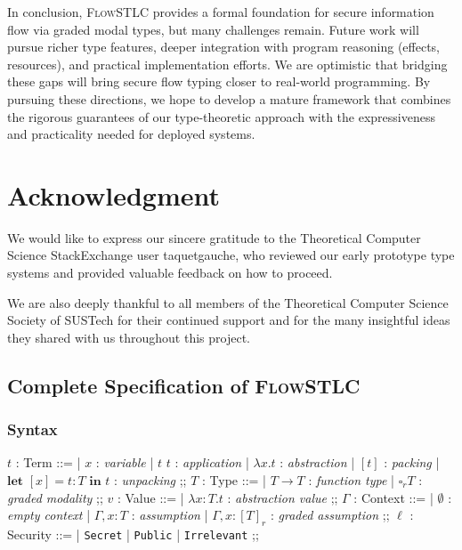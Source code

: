 \documentclass[conference]{IEEEtran}
\newcommand\lam[2]{\lambda #1.#2}
\newcommand\unp[3]{\textbf{let }[#1]=#2\textbf{ in }#3}
\newcommand\gradedt[2]{\square_#1 #2}
\newcommand\public{\texttt{Public}}
\newcommand\secret{\texttt{Secret}}
\newcommand\irrele{\texttt{Irrelevant}}
\begin{document}
In conclusion, \textsc{FlowSTLC} provides a formal foundation for secure information flow via graded modal types, but many challenges remain. Future work will pursue richer type features, deeper integration with program reasoning (effects, resources), and practical implementation efforts. We are optimistic that bridging these gaps will bring secure flow typing closer to real-world programming. By pursuing these directions, we hope to develop a mature framework that combines the rigorous guarantees of our type-theoretic approach with the expressiveness and practicality needed for deployed systems.

\section*{Acknowledgment}
We would like to express our sincere gratitude to the Theoretical Computer Science StackExchange user taquetgauche, who reviewed our early prototype type systems and provided valuable feedback on how to proceed.

We are also deeply thankful to all members of the Theoretical Computer Science Society of SUSTech for their continued support and for the many insightful ideas they shared with us throughout this project.




\newpage
\appendix

\subsection{Complete Specification of \textsc{FlowSTLC}}
\subsubsection{Syntax}
\begin{center}
	\begin{bnf}
		$t$ : \textsf{Term} ::=
		| $x$ : \textit{variable}
		| $t$ $t$ : \textit{application}
		| $\lam{x}{t}$ : \textit{abstraction}
		| $[t]$ : \textit{packing}
		| $\unp{x}{t\colon T}{t}$ : \textit{unpacking}
		;;
		$T$ : \textsf{Type} ::=
		| $T\to T$ : \textit{function type}
		| $\gradedt{r}{T}$ : \textit{graded modality}
		;;
		$v$ : \textsf{Value} ::=
		| $\lam{x\colon T}{t}$ : \textit{abstraction value}
		;;
		$\Gamma$ : \textsf{Context} ::=
		| $\emptyset$ : \textit{empty context}
        | $\Gamma,x\colon T$ : \textit{assumption}
		| $\Gamma,x\colon[T]_r$ : \textit{graded assumption}
		;;
		$\ell$ : \textsf{Security} ::=
		| \secret
		| \public
		| \irrele
		;;
	\end{bnf}
\end{center}
\end{document}
